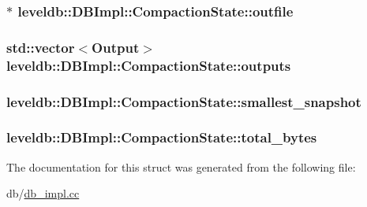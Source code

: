 \subsubsection[{outfile}]{$\ast$ leveldb\+::\+D\+B\+Impl\+::\+Compaction\+State\+::outfile}\label{structleveldb_1_1_d_b_impl_1_1_compaction_state_a4c8e3de65efc30fdf33197d544a466f9}
\hypertarget{structleveldb_1_1_d_b_impl_1_1_compaction_state_acce338739aafdfa40083ae3d5aacf24a}{}
\subsubsection[{outputs}]{\setlength{\rightskip}{0pt plus 5cm}std\+::vector$<${\bf Output}$>$ leveldb\+::\+D\+B\+Impl\+::\+Compaction\+State\+::outputs}\label{structleveldb_1_1_d_b_impl_1_1_compaction_state_acce338739aafdfa40083ae3d5aacf24a}
\hypertarget{structleveldb_1_1_d_b_impl_1_1_compaction_state_a725f0984b8372c51691d72f66672dc89}{}
\subsubsection[{smallest\+\_\+snapshot}]{ leveldb\+::\+D\+B\+Impl\+::\+Compaction\+State\+::smallest\+\_\+snapshot}\label{structleveldb_1_1_d_b_impl_1_1_compaction_state_a725f0984b8372c51691d72f66672dc89}
\hypertarget{structleveldb_1_1_d_b_impl_1_1_compaction_state_a21aa7304978dffc6841c4c11761f4b71}{}
\subsubsection[{total\+\_\+bytes}]{ leveldb\+::\+D\+B\+Impl\+::\+Compaction\+State\+::total\+\_\+bytes}\label{structleveldb_1_1_d_b_impl_1_1_compaction_state_a21aa7304978dffc6841c4c11761f4b71}


The documentation for this struct was generated from the following file\+:\begin{DoxyCompactItemize}
\item 
db/\hyperlink{db__impl_8cc}{db\+\_\+impl.\+cc}\end{DoxyCompactItemize}
